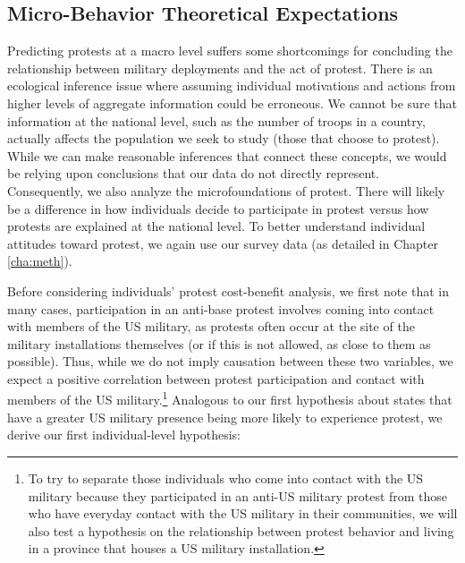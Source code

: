 		\subsection*{Micro-Behavior Theoretical Expectations}
		Predicting protests at a  macro level suffers some shortcomings for concluding the relationship between military deployments and the act of protest. There is an ecological inference issue where assuming individual motivations and actions from higher levels of aggregate information could be erroneous.\cite{King2004} We cannot be sure that information at the national level, such as the number of troops in a country, actually affects the population we seek to study (those that choose to protest). While we can make reasonable inferences that connect these concepts, we would be relying upon conclusions that our data do not directly represent. Consequently, we also analyze the microfoundations of protest. There will likely be a difference in how individuals decide to participate in protest versus how protests are explained at the national level. To better understand individual attitudes toward protest, we again use our survey data (as detailed in Chapter \ref{cha:meth}). 
		
		Before considering individuals' protest cost-benefit analysis, we first note that in many cases, participation in an anti-base protest involves coming into contact with members of the US military, as protests often occur at the site of the military installations themselves (or if this is not allowed, as close to them as possible). Thus, while we do not imply causation between these two variables, we expect a positive correlation between protest participation and contact with members of the US military.\footnote{To try to separate those individuals who come into contact with the US military because they participated in an anti-US military protest from those who have everyday contact with the US military in their communities, we will also test a hypothesis on the relationship between protest behavior and living in a province that houses a US military installation.} Analogous to our first hypothesis about states that have a greater US military presence being more likely to experience protest, we derive our first individual-level hypothesis:
		
